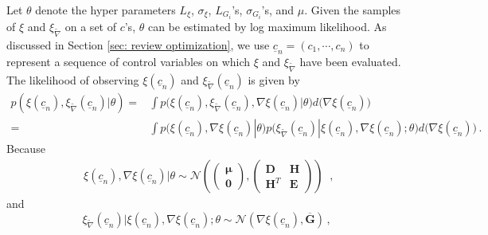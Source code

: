 Let $\theta$ denote the hyper parameters
$L_\xi$, $\sigma_\xi$, $L_{G_i}$'s, $\sigma_{G_i}$'s, and $\mu$.
Given the samples of $\xi$ and $\xi_{\tilde{\nabla}}$ on a set of $c$'s,
$\theta$ can be estimated by log maximum likelihood. 
As discussed in Section \ref{sec: review optimization}, we use $\underline{c}_n=(c_1, \cdots, c_n)$
to represent a sequence of control variables on which $\xi$ and $\xi_{\tilde{\nabla}}$ 
have been evaluated.
The likelihood of observing
$\xi(\underline{c}_n)$ 
and $\xi_{\tilde{\nabla}}(\underline{c}_n)$ is given by
\begin{equation}\begin{split}
    p\left(\xi(\underline{c}_n), \xi_{\tilde{\nabla}}(\underline{c}_n) |\theta \right) 
    =& \int p\big(\xi(\underline{c}_n), \xi_{\tilde{\nabla}}(\underline{c}_n) ,
              \nabla \xi(\underline{c}_n) | \theta\big) d\big(\nabla \xi(\underline{c}_n)\big)\\
    =& \int p\big(\xi(\underline{c}_n),\nabla\xi(\underline{c}_n) | \theta\big) 
      p\big( \xi_{\tilde{\nabla}}(\underline{c}_n) | \xi(\underline{c}_n),\nabla\xi(\underline{c}_n)
      ;\theta \big)
      d\big(\nabla \xi(\underline{c}_n)\big)\,.
    \label{eqn: marginal likelihood}
\end{split}\end{equation}
Because
\begin{equation}\begin{split}
    \xi(\underline{c}_n),\nabla \xi(\underline{c}_n) \big| \theta \sim \mathcal{N}\left(
        \begin{pmatrix}
            \boldsymbol{\mu}\\
            \boldsymbol{0}
        \end{pmatrix},
        \begin{pmatrix}
            \boldsymbol{D} & \boldsymbol{H} \\
            \boldsymbol{H}^T & \boldsymbol{E}
        \end{pmatrix}
    \right)
\end{split}\,,
\label{first term}
\end{equation}
and
\begin{equation}
    \xi_{\tilde{\nabla}}(\underline{c}_n) | \xi(\underline{c}_n),
    \nabla \xi(\underline{c}_n); \theta
    \sim 
    \mathcal{N} 
    \left(
            \nabla \xi(\underline{c}_n)
        ,
            \overline{\boldsymbol{G}}
    \right)\,,
\label{second term}
\end{equation}
